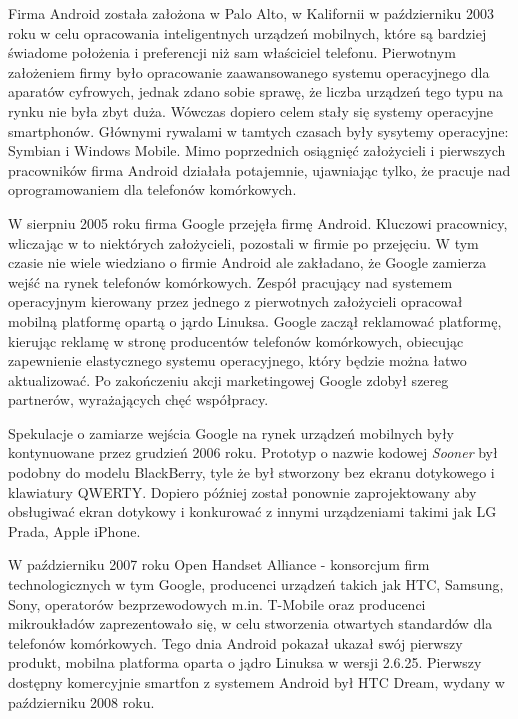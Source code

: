 Firma Android została założona w Palo Alto, w Kalifornii w październiku 2003 roku w celu opracowania inteligentnych urządzeń mobilnych, które są bardziej świadome położenia i preferencji niż sam właściciel telefonu.\cite{android:9} Pierwotnym założeniem firmy było opracowanie zaawansowanego systemu operacyjnego dla aparatów cyfrowych, jednak zdano sobie sprawę, że liczba urządzeń tego typu na rynku nie była zbyt duża. Wówczas dopiero celem stały się systemy operacyjne smartphonów. Głównymi rywalami w tamtych czasach były sysytemy operacyjne: Symbian i Windows Mobile.\cite{android:10} Mimo poprzednich osiągnięć założycieli i pierwszych pracowników firma Android działała potajemnie, ujawniając tylko, że pracuje nad oprogramowaniem dla telefonów komórkowych.\cite{android:9}

W sierpniu 2005 roku firma Google przejęła firmę Android. Kluczowi pracownicy, wliczając w to niektórych założycieli, pozostali w firmie po przejęciu.\cite{android:9} W tym czasie nie wiele wiedziano o firmie Android ale zakładano, że Google zamierza wejść na rynek telefonów komórkowych.\cite{android:9} Zespół pracujący nad systemem operacyjnym kierowany przez jednego z pierwotnych założycieli opracował mobilną platformę opartą o jąrdo Linuksa. Google zaczął reklamować platformę, kierując reklamę w stronę producentów telefonów komórkowych, obiecując zapewnienie elastycznego systemu operacyjnego, który będzie można łatwo aktualizować. Po zakończeniu akcji marketingowej Google zdobył szereg partnerów, wyrażających chęć współpracy.\cite{android:11}\cite{android:12}\cite{android:13}

Spekulacje o zamiarze wejścia Google na rynek urządzeń mobilnych były kontynuowane przez grudzień 2006 roku.\cite{android:14} Prototyp o nazwie kodowej \emph{Sooner} był podobny do modelu BlackBerry, tyle że był stworzony bez ekranu dotykowego i klawiatury QWERTY. Dopiero później został ponownie zaprojektowany aby obsługiwać ekran dotykowy i konkurować z innymi urządzeniami takimi jak LG Prada, Apple iPhone.\cite{android:15}\cite{android:16}

W październiku 2007 roku Open Handset Alliance - konsorcjum firm technologicznych w tym Google, producenci urządzeń takich jak HTC, Samsung, Sony, operatorów bezprzewodowych m.in. T-Mobile oraz producenci mikroukładów zaprezentowało się, w celu stworzenia otwartych standardów dla telefonów komórkowych.\cite{android:17} Tego dnia Android pokazał ukazał swój pierwszy produkt, mobilna platforma oparta o jądro Linuksa w wersji 2.6.25.\cite{android:17}\cite{android:18} Pierwszy dostępny komercyjnie smartfon z systemem Android był HTC Dream, wydany w październiku 2008 roku.\cite{android:19}

